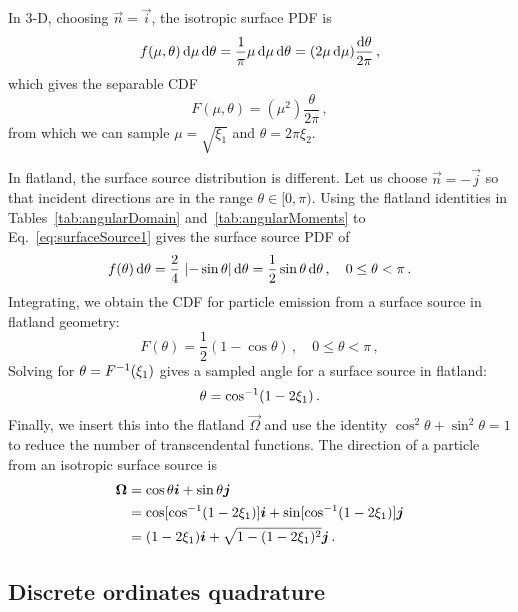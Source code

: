 In 3-D, choosing $\vec{n}=\vec{i}$, the isotropic surface PDF is
\begin{equation*}
  f(\mu,\theta) \mathop{}\!\mathrm{d}\mu \mathop{}\!\mathrm{d}\theta
  = \frac{1}{\pi} \mu \mathop{}\!\mathrm{d}\mu \mathop{}\!\mathrm{d}\theta
  = (2 \mu \mathop{}\!\mathrm{d}\mu) \frac{\mathop{}\!\mathrm{d}\theta}{2\pi}\,,
\end{equation*}
which gives the separable CDF
\begin{equation*}
  F(\mu,\theta) = (\mu^2) \frac{\theta}{2\pi}\,,
\end{equation*}
from which we can sample $\mu=\sqrt{\xi_1}$ and $\theta=2\pi \xi_2$.

In flatland, the surface source distribution is different. Let us choose
$\vec{n} = -\vec{j}$ so that incident directions are in the range
$\theta \in [0, \pi)$.
Using the flatland identities in Tables~\ref{tab:angularDomain}
and~\ref{tab:angularMoments} to Eq.~\eqref{eq:surfaceSource1} gives the surface
source PDF of
\begin{equation*}
  f(\theta) \mathop{}\!\mathrm{d}\theta = \frac{2}{4} \, \left|  -\sin \theta \right|\mathop{}\!\mathrm{d}\theta
  = \frac{1}{2} \sin \theta\mathop{}\!\mathrm{d}\theta \,,\quad 0 \le \theta < \pi\,.
\end{equation*}
Integrating, we obtain the CDF for particle emission from
a surface source in flatland geometry:
\begin{equation}\label{eq:surfaceSourceFlatland}
  F(\theta) = \frac{1}{2} \left( 1-\cos\theta \right)
  \,,\quad 0 \le \theta < \pi\,,
\end{equation}
Solving for $\theta = F^{-1}(\xi_1)$ gives a sampled angle for a surface source
in flatland:
\begin{equation*}
  \theta = \cos^{-1}(1 - 2\xi_1)\,.
\end{equation*}
Finally, we insert this into the flatland $\vec{\Omega}$ and use the identity
$\cos^2 \theta + \sin^2 \theta = 1$ to reduce the number of transcendental
functions. The direction of a particle from an isotropic surface source is
\begin{align*}
  \bm{\Omega} &= \cos \theta \bm{i} + \sin \theta \bm{j} \\
  &=  \cos[ \cos^{-1}(1 - 2\xi_1) ] \bm{i} + \sin[ \cos^{-1}(1 - 2\xi_1) ] \bm{j} \\
  &= (1 - 2\xi_1) \bm{i} + \sqrt{1 - (1 - 2\xi_1)^2} \bm{j}\,.
\end{align*}

\subsection{Discrete ordinates quadrature}

